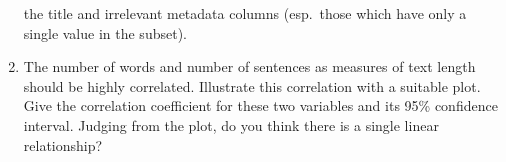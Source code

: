 \documentclass[a4paper,12pt]{article}
\begin{document}
\begin{enumerate}
  the title and irrelevant metadata columns (esp.\ those which have only a
  single value in the subset).
\item The number of words and number of sentences as measures of text length
  should be highly correlated.  Illustrate this correlation with a suitable
  plot.  Give the correlation coefficient for these two variables and its 95\%
  confidence interval.  Judging from the plot, do you think there is a single
  linear relationship?

\end{enumerate}
\end{document}
